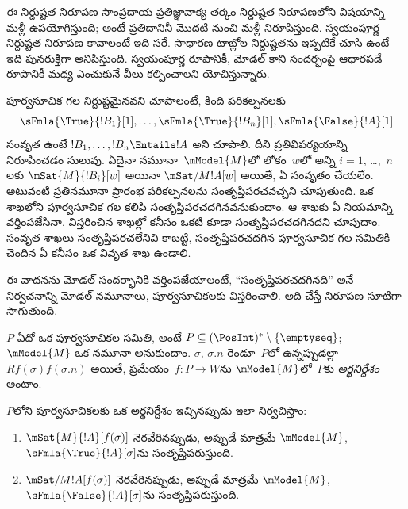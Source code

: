 \documentclass[../../../include/open-logic-section]{subfiles}
\begin{document}


\begin{editorial}
  ఈ నిర్దుష్టత నిరూపణ సాంప్రదాయ ప్రతిజ్ఞావాక్య తర్కం
  నిర్దుష్టత నిరూపణలోని విషయాన్ని మళ్లీ ఉపయోగిస్తుంది; అంటే
  ప్రతిదానినీ మొదటి నుంచి మళ్లీ నిరూపిస్తుంది. స్వయంపూర్ణ
  నిర్దుష్టత నిరూపణ కావాలంటే ఇది సరే. సాధారణ టాబ్లోల
  నిర్దుష్టతను ఇప్పటికే చూసి ఉంటే ఇది పునరుక్తిగా అనిపిస్తుంది.
  స్వయంపూర్ణ రూపానికీ, మోడల్ కాని సందర్భంపై ఆధారపడే
  రూపానికీ మధ్య ఎంచుకునే వీలు కల్పించాలని యోచిస్తున్నారు.
\end{editorial}

\begin{explain}
  పూర్వసూచిక గల  నిర్దుష్టమైనవని
  చూపాలంటే, కింది పరికల్పనలకు
  \[
  \sFmla{\True}{!B_1}[1], \dots, \sFmla{\True}{!B_n}[1], \sFmla{\False}{!A}[1]
  \]
  సంవృత  ఉంటే
  $!B_1, \dots, !B_n \Entails !A$ అని చూపాలి. దీని
  ప్రతివిపర్యయాన్ని నిరూపించడం సులువు. ఏదైనా నమూనా~$\mModel{M}$లో
లోకం~$w$లో అన్ని $i=1$, \dots,~$n$లకు
  $\mSat{M}{!B_i}[w]$ అయినా $\mSat/{M}{!A}[w]$ అయితే,
  ఏ  సంవృతం చేయలేం.
  అటువంటి ప్రతినమూనా 
ప్రారంభ పరికల్పనలను సంతృప్తిపరచవచ్చని చూపుతుంది.
  ఒక  శాఖలోని పూర్వసూచిక గల
   కలిపి సంతృప్తిపరచదగినవనుకుందాం.
  ఆ శాఖకు ఏ నియమాన్ని వర్తింపజేసినా, విస్తరించిన శాఖల్లో
  కనీసం ఒకటి కూడా సంతృప్తిపరచదగినదని చూపుదాం.
  సంవృత శాఖలు సంతృప్తిపరచలేనివి కాబట్టి,
  సంతృప్తిపరచదగిన పూర్వసూచిక గల 
  సమితికి చెందిన ఏ 
  కనీసం ఒక వివృత శాఖ ఉండాలి.

ఈ వాదనను మోడల్ సందర్భానికి వర్తింపజేయాలంటే,
  ``సంతృప్తిపరచదగినది'' అనే నిర్వచనాన్ని మోడల్ నమూనాలు,
  పూర్వసూచికలకు విస్తరించాలి. అది చేస్తే నిరూపణ సూటిగా సాగుతుంది.
\end{explain}

\begin{defn}
  $P$ ఏదో ఒక పూర్వసూచికల సమితి, అంటే $P \subseteq (\PosInt)^*
  \setminus \{\emptyseq\}$; $\mModel{M}$ ఒక నమూనా అనుకుందాం.
  $\sigma$, $\sigma.n$ రెండూ~$P$లో ఉన్నప్పుడల్లా
  $Rf(\sigma)f(\sigma.n)$ అయితే, ప్రమేయం~$f\colon P \to W$ను
  $\mModel{M}$లో~$P$కు \emph{అర్థనిర్దేశం} అంటాం.

  $P$లోని పూర్వసూచికలకు ఒక అర్థనిర్దేశం ఇచ్చినప్పుడు ఇలా నిర్వచిస్తాం:
  \begin{enumerate}
  \item $\mSat{M}{!A}[f(\sigma)]$ నెరవేరినప్పుడు, అప్పుడే మాత్రమే
    $\mModel{M}$, $\sFmla{\True}{!A}[\sigma]$ను సంతృప్తిపరుస్తుంది.
  \item $\mSat/{M}{!A}[f(\sigma)]$ నెరవేరినప్పుడు, అప్పుడే మాత్రమే
    $\mModel{M}$, $\sFmla{\False}{!A}[\sigma]$ను సంతృప్తిపరుస్తుంది.
  \end{enumerate}
\end{defn}
\end{document}
